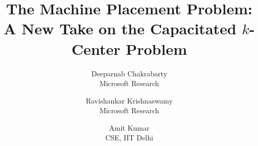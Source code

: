 \documentclass{article}[11pt]
\begin{document}
\title{The Machine Placement Problem: \\  A New Take on the Capacitated $k$-Center Problem}
\date{}
\author{Deeparnab Chakrabarty \\ Microsoft Research \and Ravishankar Krishnaswamy \\ Microsoft Research \and Amit Kumar \\ CSE, IIT Delhi}
\maketitle




\end{document}
